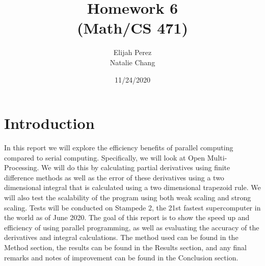 \documentclass[12pt]{article}
\title{Homework 6 \protect \\(Math/CS 471)}
\author{Elijah Perez \protect \newline \\ Natalie Chang}
\date{\vfill 11/24/2020}
\begin{document}
	\maketitle
	\pagebreak
	
	\section{Introduction}
    In this report we will explore the efficiency benefits of parallel computing compared to serial computing. Specifically, we will look at Open Multi-Processing. We will do this by calculating partial derivatives using finite difference methods as well as the error of these derivatives using a two dimensional integral that is calculated using a two dimensional trapezoid rule. We will also test the scalability of the program using both weak scaling and strong scaling. Tests will be conducted on Stampede 2, the 21st fastest supercomputer in the world as of June 2020. The goal of this report is to show the speed up and efficiency of using parallel programming, as well as evaluating the accuracy of the derivatives and integral calculations. The method used can be found in the Method section, the results can be found in the Results section, and any final remarks and notes of improvement can be found in the Conclusion section.
	
\end{document}
